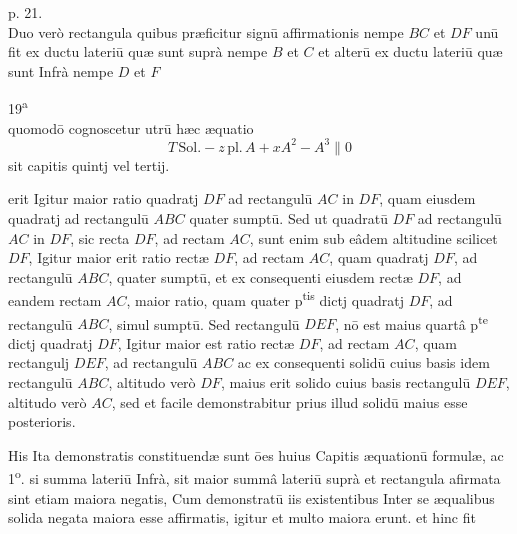 \documentclass[11pt,a4paper]{article}
\begin{document}
p. 21. \\
Duo verò rectangula quibus præficitur signū affirmationis nempe $BC$ et $DF$ unū fit ex ductu lateriū quæ sunt suprà nempe $B$ et $C$ et alterū ex ductu lateriū quæ sunt Infrà nempe $D$ et $F$


19\textsuperscript{a} \\
quomodō cognoscetur utrū hæc æquatio
\[ T\,\mathrm{Sol.} - z\,\mathrm{pl.}\,A + xA^{2} - A^{3} \parallel 0 \]
sit capitis quintj vel tertij.


erit Igitur maior ratio quadratj $DF$ ad rectangulū $AC$ in $DF$, quam eiusdem quadratj ad rectangulū $ABC$ quater sumptū. Sed ut quadratū $DF$ ad rectangulū $AC$ in $DF$, sic recta $DF$, ad rectam $AC$, sunt enim sub eâdem altitudine scilicet $DF$, Igitur maior erit ratio rectæ $DF$, ad rectam $AC$, quam quadratj $DF$, ad rectangulū $ABC$, quater sumptū, et ex consequenti eiusdem rectæ $DF$, ad eandem rectam $AC$, maior ratio, quam quater p\textsuperscript{tis} dictj quadratj $DF$, ad rectangulū $ABC$, simul sumptū. Sed rectangulū $DEF$, nō est maius quartâ p\textsuperscript{te} dictj quadratj $DF$, Igitur maior est ratio rectæ $DF$, ad rectam $AC$, quam rectangulj $DEF$, ad rectangulū $ABC$ ac ex consequenti solidū cuius basis idem rectangulū $ABC$, altitudo verò $DF$, maius erit solido cuius basis rectangulū $DEF$, altitudo verò $AC$, sed et facile demonstrabitur prius illud solidū maius esse  posterioris.

His Ita demonstratis constituendæ sunt ōes huius Capitis æquationū formulæ, ac 1\textsuperscript{o}. si summa lateriū Infrà, sit maior summâ lateriū suprà et rectangula afirmata sint etiam maiora negatis, Cum demonstratū  iis existentibus Inter se æqualibus solida negata maiora esse affirmatis, igitur et multo maiora erunt. et hinc fit
\end{document}
